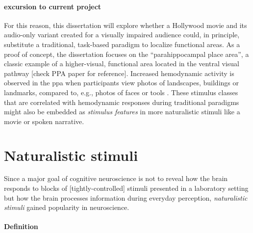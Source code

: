 \paragraph{excursion to current project}


%
For this reason, this dissertation will explore whether a Hollywood movie and
its audio-only variant created for a visually impaired audience could, in
principle, substitute a traditional, task-based paradigm to localize functional
areas.
%
As a proof of concept, the dissertation focuses on the ``parahippocampal place
area'', a classic example of a higher-visual, functional area
\citep{epstein1998ppa, epstein1999parahippocampal} located in the ventral visual
pathway [check PPA paper for reference].
Increased hemodynamic activity is observed in the \ac{ppa} when participants
view photos of landscapes, buildings or landmarks, compared to, e.g., photos of
faces or tools \citep[e.g.,][for reviews]{epstein2014neural, aminoff2013role}.
%
These stimulus classes that are correlated with hemodynamic responses during
traditional paradigms might also be embedded as \textit{stimulus features} in
more naturalistic stimuli like a movie or spoken narrative.


\section{Naturalistic stimuli}
%
Since a major goal of cognitive neuroscience is not to reveal how the brain
responds to blocks of [tightly-controlled] stimuli presented in a laboratory
setting but how the brain processes information during everyday perception,
\textit{naturalistic stimuli} gained popularity in neuroscience.


\paragraph{Definition}

